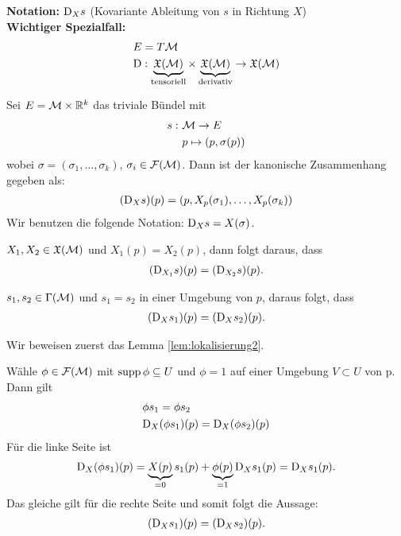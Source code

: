 \textbf{Notation:} $\mathrm{D}_X s$ (Kovariante Ableitung von $s$ in Richtung $X$)\\
\textbf{Wichtiger Spezialfall:}
\begin{align*}
&E = T\mathcal{M}\\
&\mathrm{D}: \underbrace{\mathfrak{X}(\mathcal{M})}_{\mathrm{tensoriell}} \times \underbrace{\mathfrak{X}(\mathcal{M})}_{\mathrm{derivativ}} \to \mathfrak{X}(\mathcal{M})
\end{align*}

\begin{bsp}
Sei $E = \mathcal{M} \times \mathbb{R}^k$ das triviale Bündel mit
\begin{align*}
s: \ & \mathcal{M} \to E \\
&p \mapsto (p, \sigma(p))
\end{align*}
wobei $\sigma = (\sigma_1, \dots, \sigma_k)$, $\sigma_i \in \mathcal{F}(\mathcal{M})$.
Dann ist der kanonische Zusammenhang gegeben als:
\begin{align}
(\mathrm{D}_X s)(p) = (p, X_p(\sigma_1), \dots, X_p(\sigma_k))
\end{align}
Wir benutzen die folgende Notation: $\mathrm{D}_X s = X(\sigma)$.
\end{bsp}

\begin{lem}
\label{lem:lokalisierung1}
$X_1, X_2 \in \mathfrak{X}(\mathcal{M})$ und $X_1(p) = X_2(p)$,
dann folgt daraus, dass 
\begin{align}
(\mathrm{D}_{X_1} s)(p) = (\mathrm{D}_{X_2} s) (p).
\end{align}

\end{lem}

\begin{lem}
\label{lem:lokalisierung2}
$s_1, s_2 \in \Gamma(\mathcal{M})$ und $s_1 = s_2$ in einer Umgebung von $p$,
daraus folgt, dass
\begin{align}
(\mathrm{D}_{X} s_1)(p) = (\mathrm{D}_{X} s_2) (p).
\end{align}
\end{lem}
Wir beweisen zuerst das Lemma \ref{lem:lokalisierung2}.
\begin{bew}
Wähle $\phi \in \mathcal{F}(\mathcal{M})$ mit $\operatorname{supp} \phi \subseteq U$ und $\phi = 1$ auf einer Umgebung $V \subset U$ von p.
Dann gilt 
\begin{align}
&\phi s_1 = \phi s_2 \\
&\mathrm{D}_X(\phi s_1)(p) = \mathrm{D}_X(\phi s_2)(p)
\end{align}
Für die linke Seite ist
\begin{align}
\mathrm{D}_X(\phi s_1)(p) = \underbrace{X(p)}_{=0} s_1(p) + \underbrace{\phi(p)}_{=1} \mathrm{D}_X s_1(p) = \mathrm{D}_X s_1 (p).
\end{align}
Das gleiche gilt für die rechte Seite und somit folgt die Aussage:
\begin{align*}
(\mathrm{D}_{X} s_1)(p) = (\mathrm{D}_{X} s_2) (p).
\end{align*}
\end{bew}
